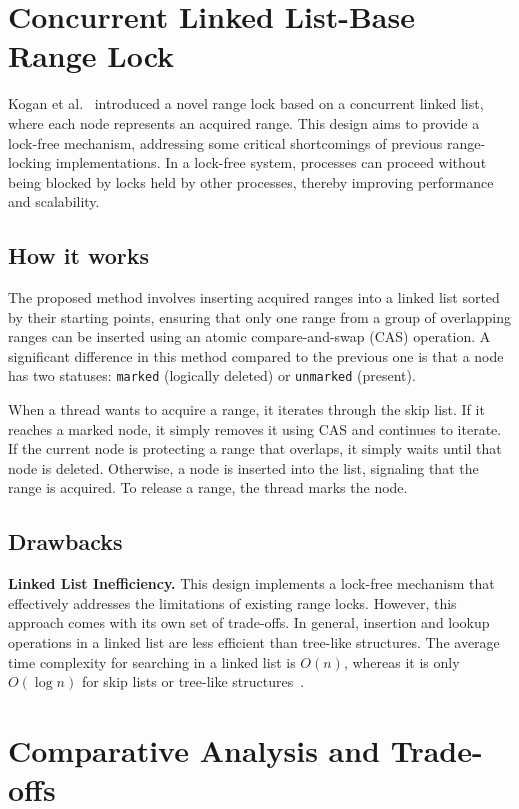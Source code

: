 \section{Concurrent Linked List-Base Range Lock}

Kogan et al.~\parencite{kogan2020scalable} introduced a novel range lock based on a concurrent linked list, where each node represents an acquired range. This design aims to provide a lock-free mechanism, addressing some critical shortcomings of previous range-locking implementations. In a lock-free system, processes can proceed without being blocked by locks held by other processes, thereby improving performance and scalability. 

\subsection*{How it works}

The proposed method involves inserting acquired ranges into a linked list sorted by their starting points, ensuring that only one range from a group of overlapping ranges can be inserted using an atomic compare-and-swap (CAS) operation. A significant difference in this method compared to the previous one is that a node has two statuses: \texttt{marked} (logically deleted) or \texttt{unmarked} (present). 

When a thread wants to acquire a range, it iterates through the skip list. If it reaches a marked node, it simply removes it using CAS and continues to iterate. If the current node is protecting a range that overlaps, it simply waits until that node is deleted. Otherwise, a node is inserted into the list, signaling that the range is acquired. To release a range, the thread marks the node. 
\subsection*{Drawbacks}

\textbf{Linked List Inefficiency.}
This design implements a lock-free mechanism that effectively addresses the limitations of existing range locks. However, this approach comes with its own set of trade-offs. In general, insertion and lookup operations in a linked list are less efficient than tree-like structures. The average time complexity for searching in a linked list is \( O(n) \), whereas it is only \( O(\log n) \) for skip lists or tree-like structures~\parencite{fomitchev2004lock}.


\section{Comparative Analysis and Trade-offs}

